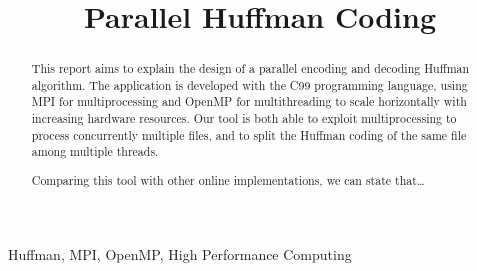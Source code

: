 \documentclass[conference]{IEEEtran}
\begin{document}
\title{Parallel Huffman Coding}

\author{
    \and
}

\maketitle

\thispagestyle{plain}
\pagestyle{plain}

\begin{abstract}
    This report aims to explain the design of a parallel encoding and decoding Huffman algorithm. The application is developed with the C99 programming language, using MPI for multiprocessing and OpenMP for multithreading to scale horizontally with increasing hardware resources. Our tool is both able to exploit multiprocessing to process concurrently multiple files, and to split the Huffman coding of the same file among multiple threads.

    Comparing this tool with other online implementations, we can state that\dots
\end{abstract}

\begin{IEEEkeywords}
    Huffman, MPI, OpenMP, High Performance Computing
\end{IEEEkeywords}








{}

\end{document}
